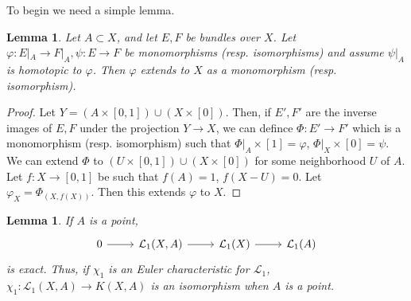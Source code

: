 \documentclass[leqno]{book}
\numberwithin{equation}{section}
\newtheorem{lemma}[theorem]{Lemma}
\theoremstyle{definition}
\begin{document}
            To begin we need a simple lemma.

            \begin{lemma}
              Let $A \subset X$, and let $E,F$ be bundles over $X$. Let $\varphi:E|_{A}\to F|_{A},\psi:E\to F$ be monomorphisms (resp. isomorphisms) and assume $\psi|_{A}$ is homotopic to $\varphi$. Then $\varphi$ extends to $X$ as a monomorphism (resp. isomorphism).
            \end{lemma}

            \begin{proof}
              Let $Y=(A\times [0,1])\cup (X\times [0])$. Then, if $E',F'$ are the inverse images of $E,F$ under the projection $Y\to X$, we can defince $\Phi:E'\to F'$ which is a monomorphism (resp. isomorphism) such that $\Phi|_{A}\times [1]=\varphi$, $\Phi|_{X}\times [0]=\psi$. We can extend $\Phi$ to $(U\times [0,1])\cup (X\times [0])$ for some neighborhood $U$ of $A$. Let $f:X\to [0,1]$ be such that $f(A)=1$, $f(X-U)=0$. Let $\varphi_{X}=\Phi_{(X,f(X))}$. Then this extends $\varphi$ to $X$.
            \end{proof}

            \begin{lemma}
              If $A$ is a point,
              \begin{equation*}
                \begin{tikzcd}
                  0\arrow[r] & \mathcal{L}_{1}(X,A)\arrow[r] & \mathcal{L}_{1	}(X)\arrow[r] & \mathcal{L}_{1}(A)
                \end{tikzcd}
              \end{equation*}
              is exact. Thus, if $\chi_1$ is an Euler characteristic for $\mathcal{L}_{1}$, $\chi_1:\mathcal{L}_{1}(X,A)\to K(X,A)$ is an isomorphism when $A$ is a point. 
            \end{lemma}
\end{document}
